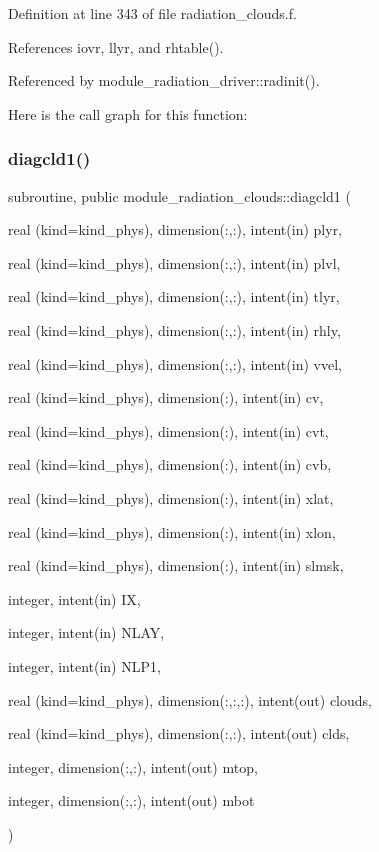 Definition at line 343 of file radiation\+\_\+clouds.\+f.



References iovr, llyr, and rhtable().



Referenced by module\+\_\+radiation\+\_\+driver\+::radinit().

Here is the call graph for this function\+:
\mbox{\label{group__module__radiation__clouds_ga022c3706242426745001b7837ae801a3}} 
\subsubsection{\texorpdfstring{diagcld1()}{diagcld1()}}
{\footnotesize\ttfamily subroutine, public module\+\_\+radiation\+\_\+clouds\+::diagcld1 (\begin{DoxyParamCaption}\item[{real (kind=kind\+\_\+phys), dimension(\+:,\+:), intent(in)}]{plyr,  }\item[{real (kind=kind\+\_\+phys), dimension(\+:,\+:), intent(in)}]{plvl,  }\item[{real (kind=kind\+\_\+phys), dimension(\+:,\+:), intent(in)}]{tlyr,  }\item[{real (kind=kind\+\_\+phys), dimension(\+:,\+:), intent(in)}]{rhly,  }\item[{real (kind=kind\+\_\+phys), dimension(\+:,\+:), intent(in)}]{vvel,  }\item[{real (kind=kind\+\_\+phys), dimension(\+:), intent(in)}]{cv,  }\item[{real (kind=kind\+\_\+phys), dimension(\+:), intent(in)}]{cvt,  }\item[{real (kind=kind\+\_\+phys), dimension(\+:), intent(in)}]{cvb,  }\item[{real (kind=kind\+\_\+phys), dimension(\+:), intent(in)}]{xlat,  }\item[{real (kind=kind\+\_\+phys), dimension(\+:), intent(in)}]{xlon,  }\item[{real (kind=kind\+\_\+phys), dimension(\+:), intent(in)}]{slmsk,  }\item[{integer, intent(in)}]{IX,  }\item[{integer, intent(in)}]{N\+L\+AY,  }\item[{integer, intent(in)}]{N\+L\+P1,  }\item[{real (kind=kind\+\_\+phys), dimension(\+:,\+:,\+:), intent(out)}]{clouds,  }\item[{real (kind=kind\+\_\+phys), dimension(\+:,\+:), intent(out)}]{clds,  }\item[{integer, dimension(\+:,\+:), intent(out)}]{mtop,  }\item[{integer, dimension(\+:,\+:), intent(out)}]{mbot }\end{DoxyParamCaption})}


